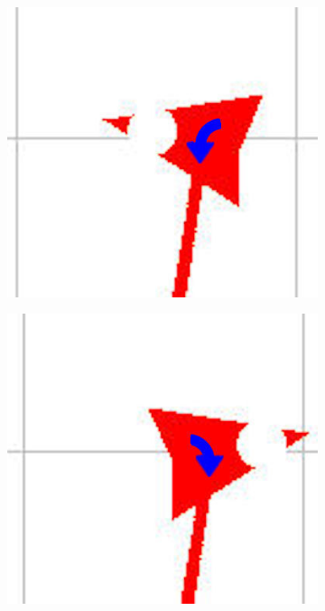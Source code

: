 \documentclass[eind]{penoverslag}
\begin{document}
\begin{figure}
\begin{subfigure}[hb]{0.2\textwidth}
        \end{subfigure}%
        \begin{subfigure}[hb]{0.2\textwidth}
                \centering
                \includegraphics[width=\textwidth]{witte_lijn3}
        \end{subfigure}%
        \begin{subfigure}[hb]{0.2\textwidth}
                \centering
                \includegraphics[width=\textwidth]{witte_lijn4}

\end{subfigure}
\end{figure}
\end{document}
